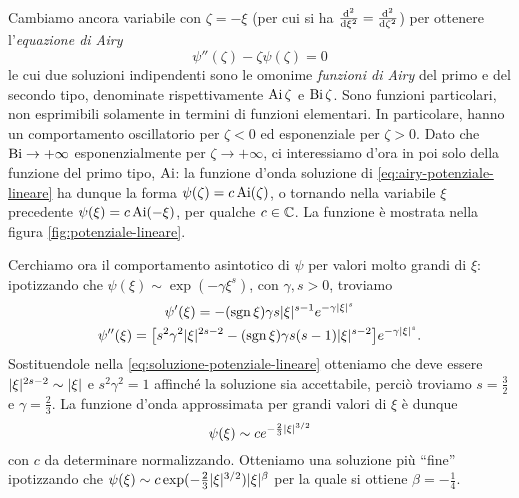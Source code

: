 Cambiamo ancora variabile con $\zeta=-\xi$ (per cui si ha $\frac{\textup{d}^2 {}}{\textup{d} {\xi}^2}=\frac{\textup{d}^2 {}}{\textup{d} {\zeta}^2}$) per ottenere l'\emph{equazione di Airy}
\begin{equation}
	\psi''(\zeta)-\zeta\psi(\zeta)=0
	\label{eq:airy-potenziale-lineare}
\end{equation}
le cui due soluzioni indipendenti sono le omonime \emph{funzioni di Airy} del primo e del secondo tipo, denominate rispettivamente $\operatorname{Ai}\zeta$ e $\operatorname{Bi}\zeta$.
Sono funzioni particolari, non esprimibili solamente in termini di funzioni elementari.
In particolare, hanno un comportamento oscillatorio per $\zeta<0$ ed esponenziale per $\zeta>0$.
Dato che $\operatorname{Bi}\to+\infty$ esponenzialmente per $\zeta\to+\infty$, ci interessiamo d'ora in poi solo della funzione del primo tipo, $\operatorname{Ai}$: la funzione d'onda soluzione di \eqref{eq:airy-potenziale-lineare} ha dunque la forma $\psi(\zeta)=c\operatorname{Ai}(\zeta)$, o tornando nella variabile $\xi$ precedente $\psi(\xi)=c\operatorname{Ai}(-\xi)$, per qualche $c\in\mathbb{C}$.
La funzione è mostrata nella figura \ref{fig:potenziale-lineare}.


Cerchiamo ora il comportamento asintotico di $\psi$ per valori molto grandi di $\xi$: ipotizzando che $\psi(\xi)\sim\exp(-\gamma{\xi}^s)$, con $\gamma,s>0$, troviamo
\begin{gather*}
	\psi'(\xi)=-(\operatorname{sgn}\xi)\gamma s\lvert\xi\rvert^{s-1}e^{-\gamma\lvert\xi\rvert^s}\\
	\psi''(\xi)=\big[s^2\gamma^2\lvert\xi\rvert^{2s-2}-(\operatorname{sgn}\xi)\gamma s(s-1)\lvert\xi\rvert^{s-2}\big]e^{-\gamma\lvert\xi\rvert^s}.
\end{gather*}
Sostituendole nella \eqref{eq:soluzione-potenziale-lineare} otteniamo che deve essere $\lvert\xi\rvert^{2s-2}\sim\lvert\xi\rvert$ e $s^2\gamma^2=1$ affinch\'e la soluzione sia accettabile, perciò troviamo $s=\frac32$ e $\gamma=\frac23$.
La funzione d'onda approssimata per grandi valori di $\xi$ è dunque
\begin{equation}
	\psi(\xi)\sim ce^{-\frac23\lvert\xi\rvert^{3/2}}
\end{equation}
con $c$ da determinare normalizzando.
Otteniamo una soluzione più ``fine'' ipotizzando che $\psi(\xi)\sim c\exp(-\frac23\lvert\xi\rvert^{3/2})\lvert\xi\rvert^\beta$ per la quale si ottiene $\beta=-\frac14$.


